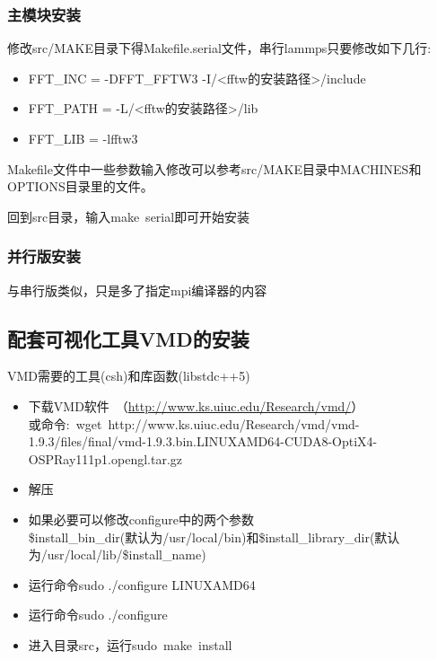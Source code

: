 \documentclass[10pt,a4paper]{article}
\begin{document}
\subsubsection{主模块安装}
修改\textrm{src/MAKE}目录下得\textrm{Makefile.serial}文件，串行\textrm{lammps}只要修改如下几行:
\begin{itemize}
	\item \textrm{FFT\_INC = -DFFT\_FFTW3 -I/<fftw的安装路径>/include}
	\item \textrm{FFT\_PATH = -L/<fftw的安装路径>/lib}
	\item \textrm{ FFT\_LIB = -lfftw3}
\end{itemize}
\textrm{Makefile}文件中一些参数输入修改可以参考\textrm{src/MAKE}目录中\textrm{MACHINES}和\textrm{OPTIONS}目录里的文件。

回到\textrm{src}目录，输入\textrm{make~serial}即可开始安装

\subsubsection{并行版安装}
与串行版类似，只是多了指定\textrm{mpi}编译器的内容

\subsection{配套可视化工具VMD的安装}
\textrm{VMD}需要的工具(\textrm{csh})和库函数(\textrm{libstdc++5})
\begin{itemize}
	\item 下载\textrm{VMD}软件~\textrm{（\url{http://www.ks.uiuc.edu/Research/vmd/}）}\\
		或命令:~\textrm{wget~http://www.ks.uiuc.edu/Research/vmd/vmd-1.9.3/files/final/vmd-1.9.3.bin.LINUXAMD64-CUDA8-OptiX4-OSPRay111p1.opengl.tar.gz}
	\item 解压
	\item 如果必要可以修改\textrm{configure}中的两个参数\\
		\textrm{\$install\_bin\_dir}(默认为\textrm{/usr/local/bin})和\textrm{\$install\_library\_dir}(默认为\textrm{/usr/local/lib/\$install\_name})
	\item 运行命令\textrm{sudo ./configure LINUXAMD64}
	\item 运行命令\textrm{sudo ./configure}
	\item 进入目录\textrm{src}，运行\textrm{sudo~make~install}
\end{itemize}
\end{document}
